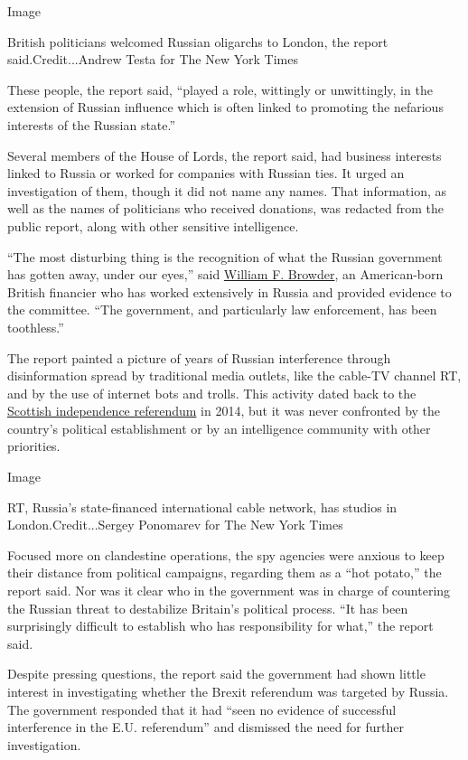 Image

British politicians welcomed Russian oligarchs to London, the report
said.Credit...Andrew Testa for The New York Times

These people, the report said, ``played a role, wittingly or
unwittingly, in the extension of Russian influence which is often linked
to promoting the nefarious interests of the Russian state.''

Several members of the House of Lords, the report said, had business
interests linked to Russia or worked for companies with Russian ties. It
urged an investigation of them, though it did not name any names. That
information, as well as the names of politicians who received donations,
was redacted from the public report, along with other sensitive
intelligence.

``The most disturbing thing is the recognition of what the Russian
government has gotten away, under our eyes,'' said
\href{https://www.nytimes.com/2018/07/16/world/europe/putin-bill-browder-magnitsky-investor.html}{William
F. Browder}, an American-born British financier who has worked
extensively in Russia and provided evidence to the committee. ``The
government, and particularly law enforcement, has been toothless.''

The report painted a picture of years of Russian interference through
disinformation spread by traditional media outlets, like the cable-TV
channel RT, and by the use of internet bots and trolls. This activity
dated back to the
\href{https://www.nytimes.com/2014/09/19/world/europe/scotland-independence-vote.html}{Scottish
independence referendum} in 2014, but it was never confronted by the
country's political establishment or by an intelligence community with
other priorities.

Image

RT, Russia's state-financed international cable network, has studios in
London.Credit...Sergey Ponomarev for The New York Times

Focused more on clandestine operations, the spy agencies were anxious to
keep their distance from political campaigns, regarding them as a ``hot
potato,'' the report said. Nor was it clear who in the government was in
charge of countering the Russian threat to destabilize Britain's
political process. ``It has been surprisingly difficult to establish who
has responsibility for what,'' the report said.

Despite pressing questions, the report said the government had shown
little interest in investigating whether the Brexit referendum was
targeted by Russia. The government responded that it had ``seen no
evidence of successful interference in the E.U. referendum'' and
dismissed the need for further investigation.

